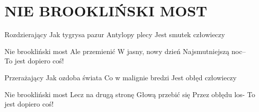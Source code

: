 \documentclass[../../../songbook.tex]{subfiles}
\begin{document}
\TabPositions{8cm} %
\section*{NIE BROOKLIŃSKI MOST}
{}
\vspace{0.5cm}
Rozdzierający			 \newline	
Jak tygrysa pazur		 \newline	
Antylopy plecy			 \newline	
Jest smutek człowieczy 	 \newline	

\-\hspace{1cm} Nie brookliński most 	 \newline	
\-\hspace{1cm} Ale przemienić			 \newline	
\-\hspace{1cm} W jasny, nowy dzień		 \newline	
\-\hspace{1cm} Najsmutniejszą noc–	 	 \newline	
\-\hspace{1cm} To jest dopiero coś!	 \newline	

Przerażający \newline	
Jak ozdoba świata \newline	
Co w malignie bredzi \newline	
Jest obłęd człowieczy \newline	

\-\hspace{1cm} Nie brookliński most \newline	
\-\hspace{1cm} Lecz na drugą stronę \newline	
\-\hspace{1cm} Głową przebić się \newline	
\-\hspace{1cm} Przez obłędu los- \newline	
\-\hspace{1cm} To jest dopiero coś! \newline	
\end{document}
